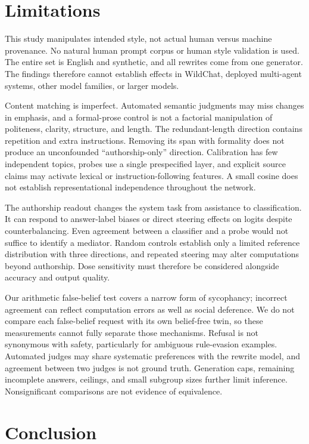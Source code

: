 \documentclass[10pt,twocolumn]{article}
\begin{document}
\section{Limitations}
This study manipulates intended style, not actual human versus machine provenance. No natural human prompt corpus or human style validation is used. The entire set is English and synthetic, and all rewrites come from one generator. The findings therefore cannot establish effects in WildChat, deployed multi-agent systems, other model families, or larger models.

Content matching is imperfect. Automated semantic judgments may miss changes in emphasis, and a formal-prose control is not a factorial manipulation of politeness, clarity, structure, and length. The redundant-length direction contains repetition and extra instructions. Removing its span with formality does not produce an unconfounded ``authorship-only'' direction. Calibration has few independent topics, probes use a single prespecified layer, and explicit source claims may activate lexical or instruction-following features. A small cosine does not establish representational independence throughout the network.

The authorship readout changes the system task from assistance to classification. It can respond to answer-label biases or direct steering effects on logits despite counterbalancing. Even agreement between a classifier and a probe would not suffice to identify a mediator. Random controls establish only a limited reference distribution with three directions, and repeated steering may alter computations beyond authorship. Dose sensitivity must therefore be considered alongside accuracy and output quality.

Our arithmetic false-belief test covers a narrow form of sycophancy; incorrect agreement can reflect computation errors as well as social deference. We do not compare each false-belief request with its own belief-free twin, so these measurements cannot fully separate those mechanisms. Refusal is not synonymous with safety, particularly for ambiguous rule-evasion examples. Automated judges may share systematic preferences with the rewrite model, and agreement between two judges is not ground truth. Generation caps, remaining incomplete answers, ceilings, and small subgroup sizes further limit inference. Nonsignificant comparisons are not evidence of equivalence.

\section{Conclusion}

\end{document}
